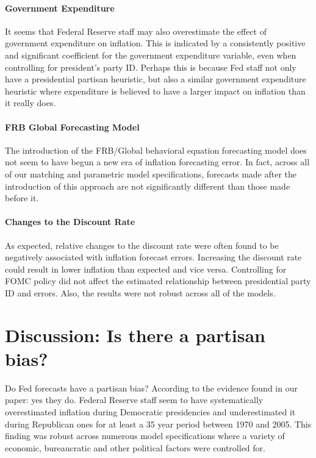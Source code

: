 \documentclass[a4paper]{article}\usepackage{graphicx, color}
\begin{document}
\paragraph{Government Expenditure}

It seems that Federal Reserve staff may also overestimate the effect of government expenditure on inflation. This is indicated by a consistently positive and significant coefficient for the government expenditure variable, even when controlling for president's party ID. Perhaps this is because Fed staff not only have a presidential partisan heuristic, but also a similar government expenditure heuristic where expenditure is believed to have a larger impact on inflation than it really does.

\paragraph{FRB Global Forecasting Model}

The introduction of the FRB/Global behavioral equation forecasting model does not seem to have begun a new era of inflation forecasting error. In fact, across all of our matching and parametric model specifications, forecasts made after the introduction of this approach are not significantly different than those made before it. 

\paragraph{Changes to the Discount Rate}

As expected, relative changes to the discount rate were often found to be negatively associated with inflation forecast errors. Increasing the discount rate could result in lower inflation than expected and vice versa. Controlling for FOMC policy did not affect the estimated relationship between presidential party ID and errors. Also, the results were not robust across all of the models. 

\section*{Discussion: Is there a partisan bias?}

Do Fed forecasts have a partisan bias? According to the evidence found in our paper: yes they do. Federal Reserve staff seem to have systematically overestimated inflation during Democratic presidencies and underestimated it during Republican ones for at least a 35 year period between 1970 and 2005. This finding was robust across numerous model specifications where a variety of economic, bureaucratic and other political factors were controlled for. 
\end{document}
